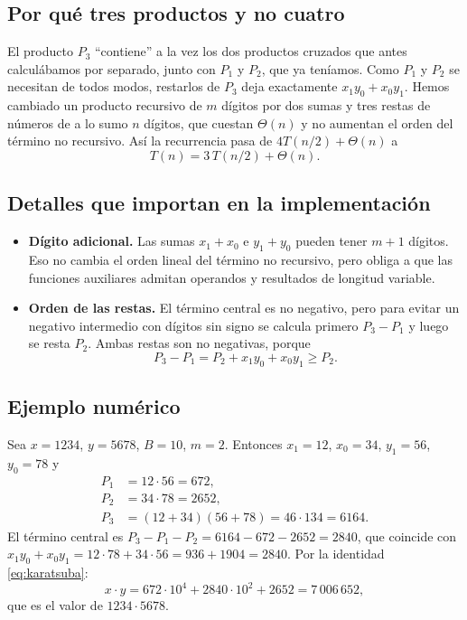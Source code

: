 \documentclass[11pt,a4paper]{article}
\begin{document}
\subsection{Por qué tres productos y no cuatro}

El producto $P_3$ ``contiene'' a la vez los dos productos cruzados que antes
calculábamos por separado, junto con $P_1$ y $P_2$, que ya teníamos. Como $P_1$
y $P_2$ se necesitan de todos modos, restarlos de $P_3$ deja exactamente
$x_1y_0 + x_0y_1$. Hemos cambiado un producto recursivo de $m$ dígitos por dos
sumas y tres restas de números de a lo sumo $n$ dígitos, que cuestan
$\Theta(n)$ y no aumentan el orden del término no recursivo. Así la recurrencia
pasa de $4T(n/2)+\Theta(n)$ a
\[
  T(n) = 3\,T(n/2) + \Theta(n).
\]

\subsection{Detalles que importan en la implementación}

\begin{itemize}
  \item \textbf{Dígito adicional.} Las sumas $x_1 + x_0$ e $y_1 + y_0$ pueden tener $m+1$ dígitos. Eso no cambia el orden lineal del término no recursivo, pero obliga a que las funciones auxiliares admitan operandos y resultados de longitud variable.
  \item \textbf{Orden de las restas.} El término central es no negativo, pero para evitar un negativo intermedio con dígitos sin signo se calcula primero $P_3 - P_1$ y luego se resta $P_2$. Ambas restas son no negativas, porque
        \[
          P_3 - P_1 = P_2 + x_1 y_0 + x_0 y_1 \ge P_2 .
        \]
\end{itemize}

\subsection{Ejemplo numérico}

Sea $x = 1234$, $y = 5678$, $B = 10$, $m = 2$. Entonces $x_1 = 12$, $x_0 = 34$,
$y_1 = 56$, $y_0 = 78$ y
\begin{align*}
  P_1 & = 12 \cdot 56 = 672,                    \\
  P_2 & = 34 \cdot 78 = 2652,                   \\
  P_3 & = (12+34)(56+78) = 46 \cdot 134 = 6164.
\end{align*}
El término central es $P_3 - P_1 - P_2 = 6164 - 672 - 2652 = 2840$, que coincide con $x_1y_0 + x_0y_1 = 12\cdot 78 + 34 \cdot 56 = 936 + 1904 = 2840$. Por la identidad \eqref{eq:karatsuba}:
\[
  x \cdot y = 672 \cdot 10^4 + 2840 \cdot 10^2 + 2652 = 7\,006\,652,
\]
que es el valor de $1234 \cdot 5678$.
\end{document}
